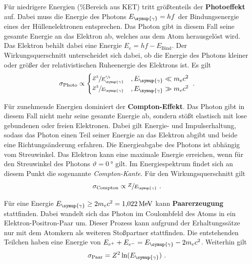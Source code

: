    \label{sec:theorie:photoeffekt}
    Für niedrigere Energien (\%Bereich aus KET) tritt größtenteils der \textbf{Photoeffekt} auf.
    Dabei muss die Energie des Photons $E_{\symup{\gamma}} = hf$ der Bindungsenergie eines der Hüllenelektronen entsprechen.
    Das Photon gibt in diesem Fall seine gesamte Energie an das Elektron ab,
    welches aus dem Atom herausgelöst wird.
    Das Elektron behält dabei eine Energie $E_{e} = hf - E_\text{Bind}$.
    Der Wirkungsquerschnitt unterscheidet sich dabei,
    ob die Energie des Photons kleiner oder größer der relativistischen Ruheenergie des Elektrons ist.
    Es gilt
    \begin{equation*}
        \sigma_\text{Photo} \propto
        \begin{cases}
            \sfrac{Z^5}{E^{\sfrac{7}{2}}_{\symup{\gamma}}} & , E_{\symup{\gamma}} \ll m_{e} c^2 \\
            \sfrac{Z^5}{E_{\symup{\gamma}}} & , E_{\symup{\gamma}} \gg m_{e} c^2 \\
        \end{cases} \ .
    \end{equation*}


    \label{sec:theorie:comptoneffekt}
    Für zunehmende Energien dominiert der \textbf{Compton-Effekt}.
    Das Photon gibt in diesem Fall nicht mehr seine gesamte Energie ab,
    sondern stößt elastisch mit lose gebundenen oder freien Elektronen.
    Dabei gilt Energie- und Impulserhaltung,
    sodass das Photon einen Teil seiner Energie an das Elektron abgibt und beide eine Richtungsänderung erfahren.
    Die Energieabgabe des Photons ist abhängig vom Streuwinkel.
    Das Elektron kann eine maximale Energie erreichen,
    wenn für den Streuwinkel des Photons $\vartheta = \SI{0}{\degree}$ gilt.
    Im Energiespektrum findet sich an diesem Punkt die sogenannte \textit{Compton-Kante}.
    Für den Wirkungsquerschnitt gilt
    \begin{equation*}
        \sigma_\text{Compton} \propto \sfrac{Z}{E_{\symup{\gamma}}} \ .
    \end{equation*}


    \label{sec:theorie:paarerzeugung}
    Für eine Energie $E_{\symup{\gamma}} \geq 2m_{e}c^2 = \SI{1.022}{\mega\eV}$ kann \textbf{Paarerzeugung} stattfinden.
    Dabei wandelt sich das Photon im Coulombfeld des Atoms in ein Elektron-Positron-Paar um.
    Dieser Prozess kann aufgrund der Erhaltungssätze nur mit dem Atomkern als weiteren Stoßpartner stattfinden.
    Die entstehenden Teilchen haben eine Energie von $E_{e^{+}} + E_{e^{-}} = E_{\symup{\gamma}} - 2m_{e}c^2$.
    Weiterhin gilt
    \begin{equation*}
        \sigma_\text{Paar} = Z^2 \ln(E_{\symup{\gamma}}) \ .
    \end{equation*}

